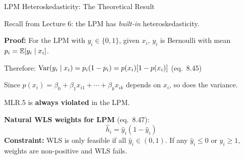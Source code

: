 \documentclass[aspectratio=169, 12pt]{beamer}
\begin{document}
\begin{frame}{LPM Heteroskedasticity: The Theoretical Result}

  Recall from Lecture 6: the LPM has \textit{built-in} heteroskedasticity.

  \begin{highlightbox}
    \textbf{Proof:} For the LPM with $y_i \in \{0,1\}$, given $x_i$, $y_i$ is Bernoulli with mean $p_i = \operatorname{\mathbb{E}}[y_i \mid x_i]$.

    \smallskip
    Therefore: $\operatorname{Var}(y_i \mid x_i) = p_i(1-p_i) = p(x_i)[1-p(x_i)]$ \quad (eq.\ 8.45)

    \smallskip
    Since $p(x_i) = \beta_0 + \beta_1 x_{i1} + \cdots + \beta_k x_{ik}$ depends on $x_i$, so does the variance.

    MLR.5 is \textbf{always violated} in the LPM.
  \end{highlightbox}

  \smallskip

  \begin{keybox}
    \textbf{Natural WLS weights for LPM} (eq.\ 8.47):
    \[
      \hat{h}_i = \hat{y}_i(1 - \hat{y}_i)
    \]
    \textbf{Constraint:} WLS is only feasible if all $\hat{y}_i \in (0,1)$. If any $\hat{y}_i \leq 0$ or $\hat{y}_i \geq 1$, weights are non-positive and WLS fails.
  \end{keybox}

\end{frame}
\end{document}
